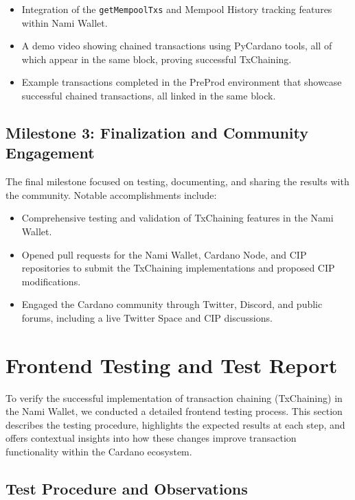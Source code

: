 \documentclass[11pt]{article}
\begin{document}
\begin{itemize}
    \item Integration of the \texttt{getMempoolTxs} and Mempool History tracking features within Nami Wallet.
    \item A demo video showing chained transactions using PyCardano tools, all of which appear in the same block, proving successful TxChaining.
    \item Example transactions completed in the PreProd environment that showcase successful chained transactions, all linked in the same block.
\end{itemize}

\subsection{Milestone 3: Finalization and Community Engagement}
The final milestone focused on testing, documenting, and sharing the results with the community. Notable accomplishments include:

\begin{itemize}
    \item Comprehensive testing and validation of TxChaining features in the Nami Wallet.
    \item Opened pull requests for the Nami Wallet, Cardano Node, and CIP repositories to submit the TxChaining implementations and proposed CIP modifications.
    \item Engaged the Cardano community through Twitter, Discord, and public forums, including a live Twitter Space and CIP discussions.
\end{itemize}

\section{Frontend Testing and Test Report}

To verify the successful implementation of transaction chaining (TxChaining) in the Nami Wallet, we conducted a detailed frontend testing process. This section describes the testing procedure, highlights the expected results at each step, and offers contextual insights into how these changes improve transaction functionality within the Cardano ecosystem.

\subsection{Test Procedure and Observations}
\end{document}

